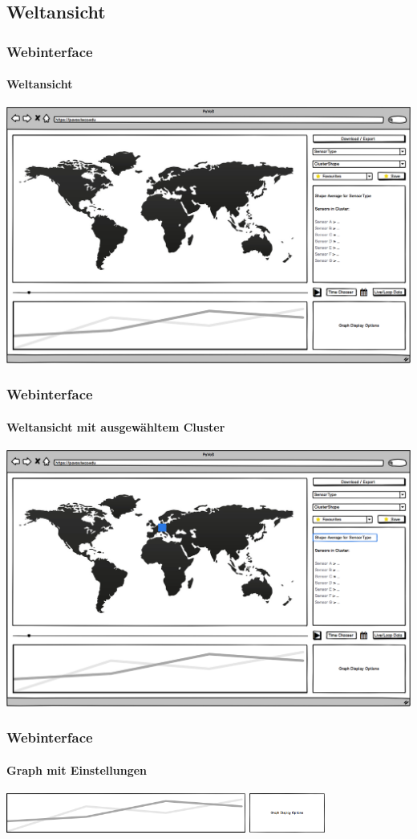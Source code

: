 \documentclass{beamer}
\begin{document}
\subsection{Weltansicht}

\begin{frame}
	\frametitle{Webinterface}
	\framesubtitle{Weltansicht}
	\centering
	\includegraphics[width=\linewidth]{gui/frontend/FrontGUIWorld}
\end{frame}

\begin{frame}
	\frametitle{Webinterface}
	\framesubtitle{Weltansicht mit ausgewähltem Cluster}
	\centering
	\includegraphics[width=\linewidth]{gui/frontend/FrontGUIWorldWithShapeSelection}
\end{frame}

\begin{frame}
	\frametitle{Webinterface}
	\framesubtitle{Graph mit Einstellungen}
	\centering
	\includegraphics[height=1.3cm]{gui/frontend/FrontGUIDetailGraph}
	\includegraphics[height=1.3cm]{gui/frontend/FrontGUIGraphSettings}
\end{frame}
\end{document}
